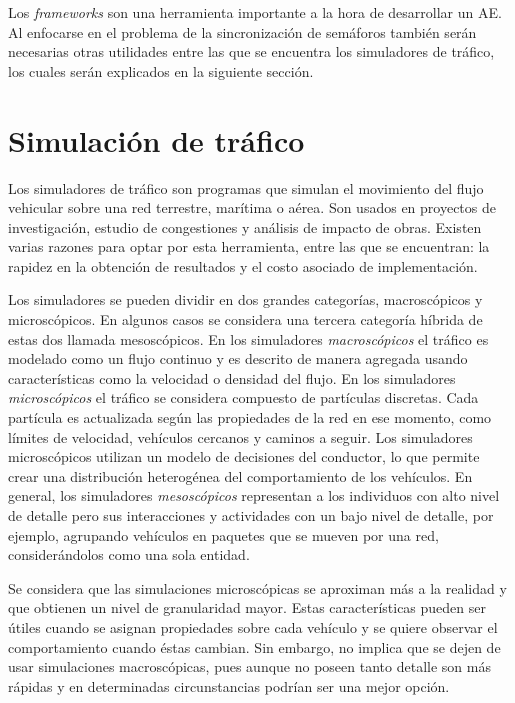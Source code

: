 Los \emph{frameworks} son una herramienta importante a la hora de desarrollar un AE. Al enfocarse en el problema de la sincronización de semáforos también serán necesarias otras utilidades entre las que se encuentra los simuladores de tráfico, los cuales serán explicados en la siguiente sección.


\section{Simulación de tráfico}

Los simuladores de tráfico son programas que simulan el movimiento del flujo vehicular sobre una red terrestre, marítima o aérea. Son usados en proyectos de investigación, estudio de congestiones y análisis de impacto de obras.  Existen varias razones para optar por esta herramienta, entre las que se encuentran: la rapidez en la obtención de resultados y el costo asociado de implementación.


Los simuladores se pueden dividir en dos grandes categorías, macroscópicos y microscópicos. En algunos casos se considera una tercera categoría híbrida de estas dos llamada mesoscópicos. En los simuladores \emph{macroscópicos} el tráfico es modelado como un flujo continuo y es descrito de manera agregada usando características como la velocidad o densidad del flujo. En los simuladores \emph{microscópicos} el tráfico se considera compuesto de partículas discretas. Cada partícula es actualizada según las propiedades de la red en ese momento, como límites de velocidad, vehículos cercanos y caminos a seguir. Los simuladores microscópicos utilizan un modelo de decisiones del conductor, lo que permite crear una distribución heterogénea del comportamiento de los vehículos. En general, los simuladores \emph{mesoscópicos} representan a los individuos con alto nivel de detalle pero sus interacciones y actividades con un bajo nivel de detalle, por ejemplo, agrupando vehículos en paquetes que se mueven por una red, considerándolos como una sola entidad.


Se considera que las simulaciones microscópicas se aproximan más a la realidad y que obtienen un nivel de granularidad mayor. Estas características pueden ser útiles cuando se asignan propiedades sobre cada vehículo y se quiere observar el comportamiento cuando éstas cambian. Sin embargo, no implica que se dejen de usar simulaciones macroscópicas, pues aunque no poseen tanto detalle son más rápidas y en determinadas circunstancias podrían ser una mejor opción.

